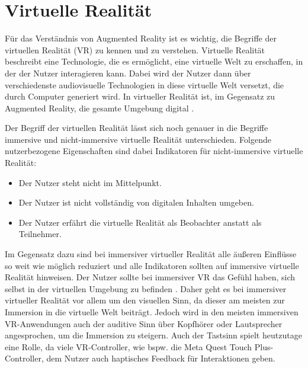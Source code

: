   \section{Virtuelle Realität}
  Für das Verständnis von Augmented Reality ist es wichtig, die Begriffe der virtuellen Realität (VR) zu kennen und zu verstehen.
  Virtuelle Realität beschreibt eine Technologie, die es ermöglicht, eine virtuelle Welt zu erschaffen, in der der Nutzer interagieren kann.
  Dabei wird der Nutzer dann über verschiedenste audiovisuelle Technologien in diese virtuelle Welt versetzt, die durch Computer generiert wird.
  In virtueller Realität ist, im Gegensatz zu Augmented Reality, die gesamte Umgebung digital
  \autocite[vgl.][S.15]{Dalton2023}.

  Der Begriff der virtuellen Realität lässt sich noch genauer in die Begriffe immersive und nicht-immersive virtuelle Realität unterschieden.
  Folgende nutzerbezogene Eigenschaften sind dabei Indikatoren für nicht-immersive virtuelle Realität:
  \begin{itemize}
    \item Der Nutzer steht nicht im Mittelpunkt.
    \item Der Nutzer ist nicht vollständig von digitalen Inhalten umgeben.
    \item Der Nutzer erfährt die virtuelle Realität als Beobachter anstatt als Teilnehmer.
  \end{itemize}
  Im Gegensatz dazu sind bei immersiver virtueller Realität alle äußeren Einflüsse so weit wie möglich reduziert und alle Indikatoren sollten auf immersive virtuelle Realität hinweisen.
  Der Nutzer sollte bei immersiver VR das Gefühl haben, sich selbst in der virtuellen Umgebung zu befinden \autocite[vgl.][S.23-24]{Wolfel2023}.
  Daher geht es bei immersiver virtueller Realität vor allem um den visuellen Sinn, da dieser am meisten zur Immersion in die virtuelle Welt beiträgt.
  Jedoch wird in den meisten immersiven VR-Anwendungen auch der auditive Sinn über Kopfhörer oder Lautsprecher angesprochen, um die Immersion zu steigern.
  Auch der Tastsinn spielt heutzutage eine Rolle, da viele VR-Controller, wie bspw. die Meta Quest Touch Plus-Controller, dem Nutzer auch haptisches Feedback für Interaktionen geben.

